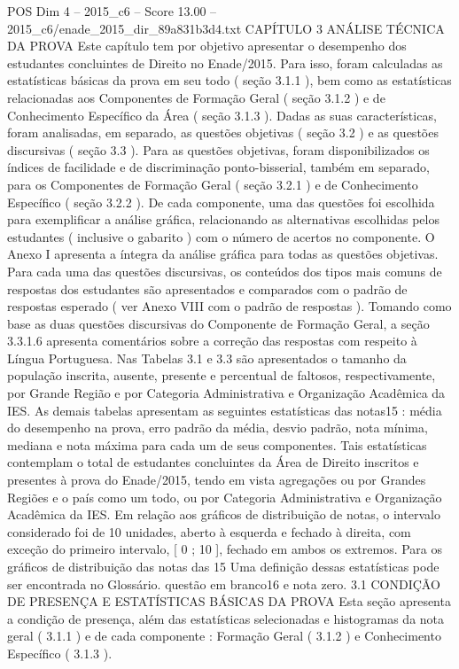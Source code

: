 \begin{textsample}{POS Dim 4 – 2015\_c6 – Score 13.00 – 2015\_c6/enade\_2015\_dir\_89a831b3d4.txt}  \label{ex:f4_pos_024}
CAPÍTULO 3 ANÁLISE TÉCNICA DA PROVA Este capítulo tem por objetivo apresentar o desempenho dos estudantes concluintes de Direito no Enade/2015.
Para isso, foram calculadas as estatísticas básicas da prova em seu todo ( seção 3.1.1 ), bem como as estatísticas relacionadas aos Componentes de Formação Geral ( seção 3.1.2 ) e de Conhecimento Específico da Área ( seção 3.1.3 ).
Dadas as suas características, foram analisadas, em separado, as questões objetivas ( seção 3.2 ) e as questões discursivas ( seção 3.3 ).
Para as questões objetivas, foram disponibilizados os índices de facilidade e de discriminação ponto-bisserial, também em separado, para os Componentes de Formação Geral ( seção 3.2.1 ) e de Conhecimento Específico ( seção 3.2.2 ).
De cada componente, uma das questões foi escolhida para exemplificar a análise gráfica, relacionando as alternativas escolhidas pelos estudantes ( inclusive o gabarito ) com o número de acertos no componente.
O Anexo I apresenta a íntegra da análise gráfica para todas as questões objetivas.
Para cada uma das questões discursivas, os conteúdos dos tipos mais comuns de respostas dos estudantes são apresentados e comparados com o padrão de respostas esperado ( ver Anexo VIII com o padrão de respostas ).
Tomando como base as duas questões discursivas do Componente de Formação Geral, a seção 3.3.1.6 apresenta comentários sobre a correção das respostas com respeito à Língua Portuguesa.
Nas Tabelas 3.1 e 3.3 são apresentados o tamanho da população inscrita, ausente, presente e percentual de faltosos, respectivamente, por Grande Região e por Categoria Administrativa e Organização Acadêmica da IES.
As demais tabelas apresentam as seguintes estatísticas das notas15 : média do desempenho na prova, erro padrão da média, desvio padrão, nota mínima, mediana e nota máxima para cada um de seus componentes.
Tais estatísticas contemplam o total de estudantes concluintes da Área de Direito inscritos e presentes à prova do Enade/2015, tendo em vista agregações ou por Grandes Regiões e o país como um todo, ou por Categoria Administrativa e Organização Acadêmica da IES.
Em relação aos gráficos de distribuição de notas, o intervalo considerado foi de 10 unidades, aberto à esquerda e fechado à direita, com exceção do primeiro intervalo, [ 0 ; 10 ], fechado em ambos os extremos.
Para os gráficos de distribuição das notas das 15 Uma definição dessas estatísticas pode ser encontrada no Glossário. questão em branco16 e nota zero. 3.1 CONDIÇÃO DE PRESENÇA E ESTATÍSTICAS BÁSICAS DA PROVA Esta seção apresenta a condição de presença, além das estatísticas selecionadas e histogramas da nota geral ( 3.1.1 ) e de cada componente : Formação Geral ( 3.1.2 ) e Conhecimento Específico ( 3.1.3 ).

\end{textsample}
